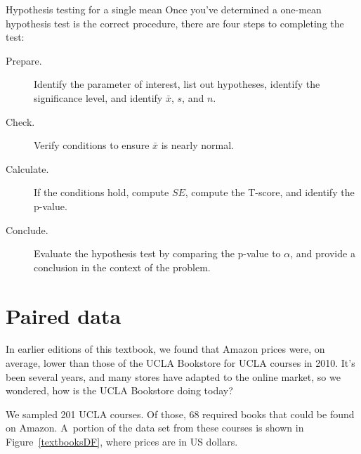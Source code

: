 \begin{onebox}{Hypothesis testing for a single mean}
  Once you've determined a one-mean hypothesis test is the
  correct procedure, there are four steps to completing the
  test:
  \begin{description}
  \item[Prepare.]
      Identify the parameter of interest,
      list out hypotheses,
      identify the significance level,
      and identify $\bar{x}$, $s$, and $n$.
  \item[Check.]
      Verify conditions to ensure $\bar{x}$ is nearly normal.
  \item[Calculate.]
      If the conditions hold, compute $SE$,
      compute the T-score, and identify the p-value.
  \item[Conclude.]
      Evaluate the hypothesis test by comparing the p-value
      to $\alpha$, and provide a conclusion in the context
      of the problem.
  \end{description}
\end{onebox}






\section{Paired data}
\label{pairedData}

\newcommand{\uclabookN}{68}
\newcommand{\uclabookM}{3.58}
\newcommand{\uclabookSD}{13.42}
\newcommand{\uclabookSE}{1.63}


\noindent%
In earlier editions of this textbook,
we found that Amazon prices were, on average,
lower than those of the UCLA Bookstore for UCLA courses
in 2010.
It's been several years, and many stores have adapted
to the online market, so we wondered,
how is the UCLA Bookstore doing today?

We sampled 201 UCLA courses.
Of those, \uclabookN{}
required books that could be found on Amazon.
A~portion of the data set from these courses
is shown in Figure~\ref{textbooksDF},
where prices are in US dollars.

